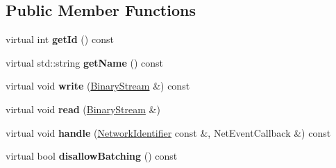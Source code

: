 \subsection*{Public Member Functions}
\begin{DoxyCompactItemize}
\item 
\mbox{\label{struct_player_action_packet_ae6a83ecd08d4303e641e06de937f04b4}} 
virtual int {\bfseries get\+Id} () const
\item 
\mbox{\label{struct_player_action_packet_a76a8d3c20d3105373590087a7d5aff59}} 
virtual std\+::string {\bfseries get\+Name} () const
\item 
\mbox{\label{struct_player_action_packet_ad69c57a1c5143d2671b32706b8f860ac}} 
virtual void {\bfseries write} (\mbox{\hyperlink{struct_binary_stream}{Binary\+Stream}} \&) const
\item 
\mbox{\label{struct_player_action_packet_a5182d9c5f2dfcfaa8e2ac46bfe3b30e0}} 
virtual void {\bfseries read} (\mbox{\hyperlink{struct_binary_stream}{Binary\+Stream}} \&)
\item 
\mbox{\label{struct_player_action_packet_a1bc17d3cc2b8f41958c5d4c0e8fdc293}} 
virtual void {\bfseries handle} (\mbox{\hyperlink{struct_network_identifier}{Network\+Identifier}} const \&, Net\+Event\+Callback \&) const
\item 
\mbox{\label{struct_player_action_packet_a81e62e5bff6ac256f1e293274f89c351}} 
virtual bool {\bfseries disallow\+Batching} () const
\end{DoxyCompactItemize}
